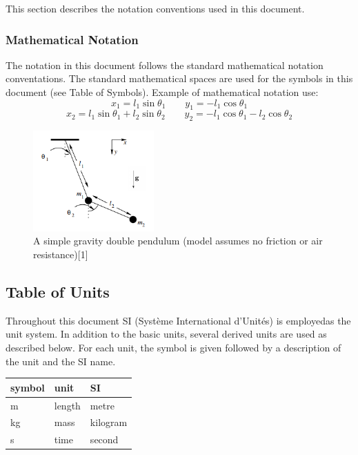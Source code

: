 \documentclass[12pt]{article}
\begin{document}
This section describes the notation conventions used in this document.

\subsubsection{Mathematical Notation}

The notation in this document follows the standard mathematical notation
conventations.
The standard mathematical spaces are used for the symbols in this document (see
Table of Symbols).
Example of mathematical notation use:
$$x_1 = l_1 \sin\theta_1 \quad\quad y_1 = -l_1 \cos\theta_1$$
$$x_2 = l_1 \sin\theta_1 + l_2 \sin\theta_2 \quad\quad y_2 = -l_1\cos\theta_1
-l_2\cos\theta_2$$

\begin{figure}[H]
	\centering
	\includegraphics[width=175px]{doublepend.PNG}
\caption{A simple gravity double pendulum (model assumes no friction or air
resistance)[1]}
	\label{fig:maxresdefault}
\end{figure}

\subsection{Table of Units}

Throughout this document SI (Syst\`{e}me International d'Unit\'{e}s) is
employedas the unit system. In addition to the basic units, several derived
units are
used as described below.  For each unit, the symbol is given followed by a
description of the unit and the SI name.\\

\renewcommand{\arraystretch}{1.2}
\begin{center}
  \noindent \begin{tabular}{l l l} 
    \toprule		
    \textbf{symbol} & \textbf{unit} & \textbf{SI}\\
    \midrule 
    \si{\metre} & length & metre\\
    \si{\kilogram} & mass & kilogram\\
    \si{\second} & time & second\\
    \bottomrule
  \end{tabular}
\end{center}
\end{document}
